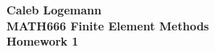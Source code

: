 \documentclass[11pt, oneside]{article}
\begin{document}
\noindent \textbf{\Large{Caleb Logemann \\
MATH666 Finite Element Methods \\
Homework 1
}}
\pagebreak

%
\begin{enumerate}

\end{enumerate}
\end{document}
